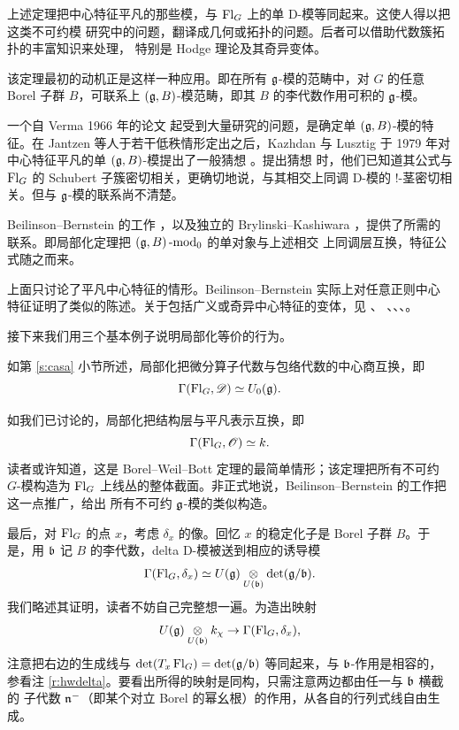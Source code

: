 上述定理把中心特征平凡的那些模，与 $\operatorname{Fl}_G$ 上的单 D-模等同起来。这使人得以把这类不可约模
研究中的问题，翻译成几何或拓扑的问题。后者可以借助代数簇拓扑的丰富知识来处理，
特别是 Hodge 理论及其奇异变体。

该定理最初的动机正是这样一种应用。即在所有 $\mathfrak{g}$-模的范畴中，对 $G$ 的任意 Borel
子群 $B$，可联系上 $(\mathfrak{g}, B)$-模范畴，即其 $B$ 的李代数作用可积的 $\mathfrak{g}$-模。

一个自 Verma 1966 年的论文 \cite{verma66} 起受到大量研究的问题，是确定单
$(\mathfrak{g}, B)$-模的特征。在 Jantzen \cite{jantz79} 等人于若干低秩情形定出之后，Kazhdan 与
Lusztig 于 1979 年对中心特征平凡的单 $(\mathfrak{g},B)$-模提出了一般猜想 \cite{kl79}。提出猜想
时，他们已知道其公式与 $\operatorname{Fl}_G$ 的 Schubert 子簇密切相关，更确切地说，与其相交上同调
D-模的 $!$-茎密切相关。但与 $\mathfrak{g}$-模的联系尚不清楚。

Beilinson--Bernstein 的工作 \cite{bb82}，以及独立的 Brylinski--Kashiwara
\cite{brylin81}，提供了所需的联系。即局部化定理把 $(\mathfrak{g},B)\operatorname{-mod}_0$ 的单对象与上述相交
上同调层互换，特征公式随之而来。

\begin{re} 上面只讨论了平凡中心特征的情形。Beilinson--Bernstein 实际上对任意正则中心
特征证明了类似的陈述。关于包括广义或奇异中心特征的变体，见 \cite{kashloc}、
\cite{beilinsonginzburg}、\cite{bmr}、\cite{krem}、\cite{ahc}。 \end{re}

\ssszh 接下来我们用三个基本例子说明局部化等价的行为。

\begin{ex} 如第 \ref{s:casa} 小节所述，局部化把微分算子代数与包络代数的中心商互换，即
%
\[
\Gamma(\operatorname{Fl}_G, \mathscr{D}) \simeq U_0(\mathfrak{g}).
\]
%
\end{ex}

\begin{ex}如我们已讨论的，局部化把结构层与平凡表示互换，即
%
\[
\Gamma(\operatorname{Fl}_G, \mathscr{O}) \simeq k.
\]
%
读者或许知道，这是 Borel--Weil--Bott 定理的最简单情形；该定理把所有不可约 $G$-模构造为
$\operatorname{Fl}_G$ 上线丛的整体截面。非正式地说，Beilinson--Bernstein 的工作把这一点推广，给出
所有不可约 $\mathfrak{g}$-模的类似构造。
\end{ex}

\begin{ex} 最后，对 $\operatorname{Fl}_G$ 的点 $x$，考虑 $\delta_x$ 的像。回忆 $x$ 的稳定化子是 Borel
子群 $B$。于是，用 $\mathfrak{b}$ 记 $B$ 的李代数，delta D-模被送到相应的诱导模
%
\begin{equation}
\Gamma(\operatorname{Fl}_G, \delta_x) \simeq U(\mathfrak{g}) \underset{U(\mathfrak{b})} \otimes
\det(\mathfrak{g}/\mathfrak{b}).
\end{equation}
%
我们略述其证明，读者不妨自己完整想一遍。为造出映射
%
\begin{equation} \label{e:hwv}
U(\mathfrak{g}) \underset{U(\mathfrak{b})} \otimes k_{\chi} \rightarrow \Gamma(\operatorname{Fl}_G,
\delta_x),
\end{equation}
%
注意把右边的生成线与 $\det(T_x \operatorname{Fl}_G) = \det( \mathfrak{g}/\mathfrak{b})$ 等同起来，与 $\mathfrak{b}$-作用是相容的，
参看注 \ref{r:hwdelta}。要看出所得的映射是同构，只需注意两边都由任一与 $\mathfrak{b}$ 横截的
子代数 $\mathfrak{n}^-$（即某个对立 Borel 的幂幺根）的作用，从各自的行列式线自由生成。
\end{ex}

